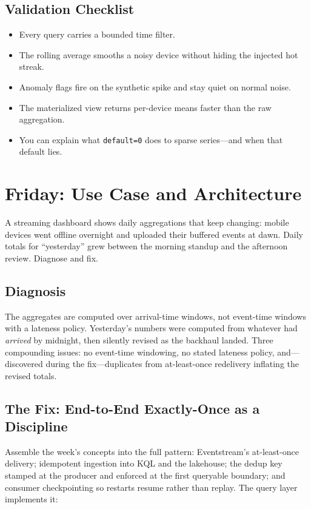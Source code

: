 \subsection{Validation Checklist}
\begin{itemize}
    \item Every query carries a bounded time filter.
    \item The rolling average smooths a noisy device without hiding the injected hot streak.
    \item Anomaly flags fire on the synthetic spike and stay quiet on normal noise.
    \item The materialized view returns per-device means faster than the raw aggregation.
    \item You can explain what \texttt{default=0} does to sparse series---and when that default lies.
\end{itemize}

\section{Friday: Use Case and Architecture}
A streaming dashboard shows daily aggregations that keep changing: mobile devices went offline overnight and uploaded their buffered events at dawn. Daily totals for ``yesterday'' grew between the morning standup and the afternoon review. Diagnose and fix.

\subsection{Diagnosis}
The aggregates are computed over arrival-time windows, not event-time windows with a lateness policy. Yesterday's numbers were computed from whatever had \emph{arrived} by midnight, then silently revised as the backhaul landed. Three compounding issues: no event-time windowing, no stated lateness policy, and---discovered during the fix---duplicates from at-least-once redelivery inflating the revised totals.

\subsection{The Fix: End-to-End Exactly-Once as a Discipline}
Assemble the week's concepts into the full pattern: Eventstream's at-least-once delivery; idempotent ingestion into KQL and the lakehouse; the dedup key stamped at the producer and enforced at the first queryable boundary; and consumer checkpointing so restarts resume rather than replay. The query layer implements it:

